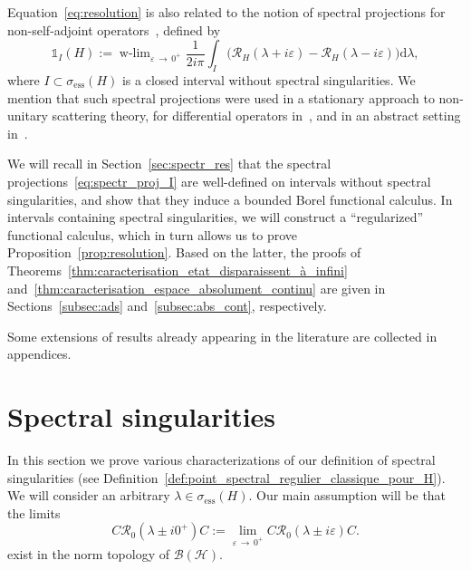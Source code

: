 \documentclass[10pt]{amsart}
\theoremstyle{definition}\newtheorem{defi}[theo]{Definition}\newtheorem{rema}[theo]{Remark}\newtheorem{exam}[theo]{Example}\newtheorem{exem}[theo]{Example}\newtheorem{nota}[theo]{Notation}
\newcommand{\Hi}{\mathcal{H}}
\newcommand{\ess}{\mathrm{ess}}
\newcommand{\rmd}{\mathrm{d}}
\newcommand{\Res}{\mathcal{R}}
\newcommand{\clB}{\mathcal{B}}
\DeclareMathOperator{\wlim}{w-lim}
\begin{document}
Equation~\eqref{eq:resolution} is also related to the notion of spectral projections for non-self-adjoint operators~\cite{DuSc71_01,Du58_01,Sc60_01}, defined by
\begin{equation}\label{eq:spectr_proj_I}
\mathds{1}_I(H) := \wlim_{\varepsilon\,\to\,0^+} \frac{1}{ 2 i \pi } \int_I \big (\Res_H (\lambda + i \varepsilon) - \Res_H (\lambda - i \varepsilon) \big) \rmd  \lambda,
\end{equation}
where $I \subset \sigma_{\ess}(H)$ is a closed interval without spectral singularities. We mention that such spectral projections were used in a stationary approach to non-unitary scattering theory, for differential operators in~\cite{Mo67_01,Mo68_01}, and in an abstract setting in~\cite{Go70_01,Go71_01,Hu71_01}.

We will recall in Section~\ref{sec:spectr_res} that the spectral projections~\eqref{eq:spectr_proj_I} are well-defined on intervals without spectral singularities, and show that they induce a bounded Borel functional calculus. In intervals containing spectral singularities, we will construct a ``regularized'' functional calculus, which in turn allows us to prove Proposition~\ref{prop:resolution}. Based on the latter, the proofs of Theorems~\ref{thm:caracterisation_etat_disparaissent_à_infini} and~\ref{thm:caracterisation_espace_absolument_continu} are given in Sections~\ref{subsec:ads} and~\ref{subsec:abs_cont}, respectively.

Some extensions of results already appearing in the literature are collected in appendices.


\section{Spectral singularities}\label{sec:spectr_sing}


In this section we prove various characterizations of our definition of spectral singularities (see Definition~\ref{def:point_spectral_regulier_classique_pour_H}). We will consider an arbitrary $\lambda\in\sigma_{\ess}(H)$. Our main assumption will be that the limits
\begin{equation}\label{eq:LAP_lambda}
C\Res_0(\lambda\pm i0^+)C:=\lim_{\varepsilon\,\rightarrow\,0^+}C\Res_0(\lambda \pm i\varepsilon)C.
\end{equation}
exist in the norm topology of $\clB(\Hi)$.
\end{document}

